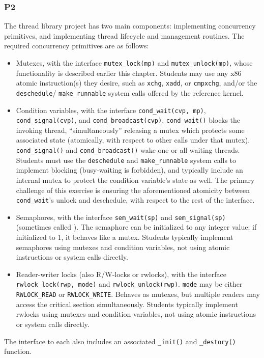 \subsubsection{P2}
The thread library project \cite{thrlib} has two main components: implementing concurrency primitives, and implementing thread lifecycle and management routines.
The required concurrency primitives  are as follows:
\begin{itemize}
	\item Mutexes, with the interface {\tt mutex\_lock(mp)} and {\tt mutex\_unlock(mp)}, whose functionality is described earlier this chapter. Students may use any x86 atomic instruction(s) they desire, such as {\tt xchg}, {\tt xadd}, or {\tt cmpxchg}, and/or the {\tt deschedule}/ {\tt make\_runnable} system calls offered by the reference kernel.
	\item Condition variables, with the interface {\tt cond\_wait(cvp, mp)}, {\tt cond\_signal(cvp)}, and {\tt cond\_broadcast(cvp)}. {\tt cond\_wait()} blocks the invoking thread, ``simultaneously'' releasing a mutex which protects some associated state (atomically, with respect to other calls under that mutex).
		{\tt cond\_signal()} and {\tt cond\_broadcast()} wake one or all waiting threads.
		Students must use the {\tt deschedule} and {\tt make\_runnable} system calls to implement blocking (busy-waiting is forbidden), and typically include an internal mutex to protect the condition variable's state as well.
		The primary challenge of this exercise is ensuring the aforementioned atomicity between {\tt cond\_wait}'s unlock and deschedule, with respect to the rest of the interface.
	\item Semaphores, with the interface {\tt sem\_wait(sp)} and {\tt sem\_signal(sp)}
		(sometimes called ).
		The semaphore can be initialized to any integer value; if initialized to 1, it behaves like a mutex.
		Students typically implement semaphores using mutexes and condition variables, not using atomic instructions or system calls directly.
	\item Reader-writer locks (also R/W-locks or rwlocks), with the interface {\tt rwlock\_lock(rwp, mode)} and {\tt rwlock\_unlock(rwp)}. {\tt mode} may be either {\tt RWLOCK\_READ} or {\tt RWLOCK\_\allowbreak{}WRITE}.
		Behaves as mutexes, but multiple readers may access the critical section simultaneously.
		Students typically implement rwlocks using mutexes and condition variables, not using atomic instructions or system calls directly.
\end{itemize}
The interface to each also includes an associated {\tt \_init()} and {\tt \_destory()} function.

